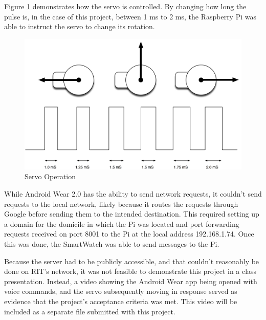 \documentclass[a4paper]{article}
\begin{document}
Figure \ref{fig:servo} demonstrates how the servo is controlled.
By changing how long the pulse is, in the case of this project, between 1 ms to 2 ms, the Raspberry Pi was able to instruct the servo to change its rotation.
\begin{figure}[H]
    \center
    \caption{Servo Operation}
    \label{fig:servo}
    \includegraphics[width=12cm]{servoOperation.png}
\end{figure}

While Android Wear 2.0 has the ability to send network requests, it couldn't send requests to the local network, likely because it routes the requests through Google before sending them to the intended destination.
This required setting up a domain for the domicile in which the Pi was located and port forwarding requests received on port 8001 to the Pi at the local address 192.168.1.74.
Once this was done, the SmartWatch was able to send messages to the Pi.

Because the server had to be publicly accessible, and that couldn't reasonably be done on RIT's network, it was not feasible to demonstrate this project in a class presentation.
Instead, a video showing the Android Wear app being opened with voice commands, and the servo subsequently moving in response served as evidence that the project's acceptance criteria was met.
This video will be included as a separate file submitted with this project.
\end{document}
